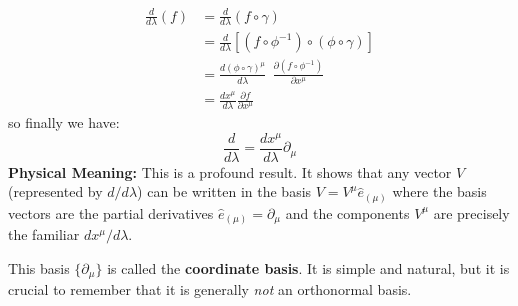 \documentclass[11pt, a4paper]{report}
\begin{document}
\begin{equation}
\begin{split}
    \frac{d}{d\lambda}(f) &= \frac{d}{d\lambda} (f \circ \gamma) \\
    &= \frac{d}{d\lambda} [(f \circ \phi^{-1}) \circ (\phi \circ \gamma)] \\
    &= \frac{d(\phi \circ \gamma)^\mu}{d\lambda} \ \ \frac{\partial(f \circ \phi^{-1})}{\partial x^\mu} \\
    &= \frac{dx^\mu}{d\lambda} \frac{\partial f}{\partial x^\mu}
\end{split}
\end{equation}
so finally we have: 
$$\frac{d}{d\lambda} = \frac{dx^\mu}{d\lambda} {\partial_\mu }$$
\textbf{Physical Meaning:} This is a profound result. It shows that any vector $V$ (represented by $d/d\lambda$) can be written in the basis $V = V^\mu \hat{e}_{(\mu)}$ where the basis vectors are the partial derivatives $\hat{e}_{(\mu)} = \partial_\mu$ and the components $V^\mu$ are precisely the familiar $dx^\mu/d\lambda$.

This basis $\{\partial_\mu\}$ is called the \textbf{coordinate basis}. It is simple and natural, but it is crucial to remember that it is generally \emph{not} an orthonormal basis.
\end{document}
